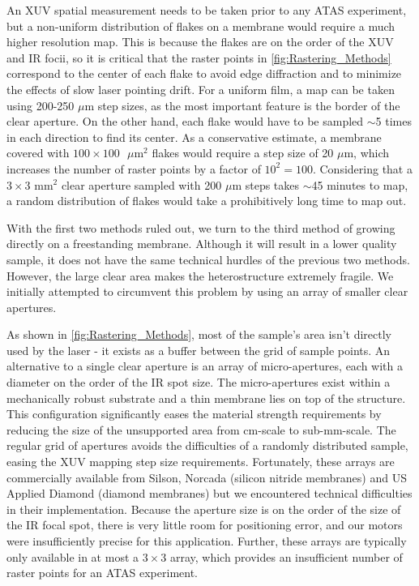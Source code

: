 An XUV spatial measurement needs to be taken prior to any ATAS experiment, but a non-uniform distribution of flakes on a membrane would require a much higher resolution map. This is because the flakes are on the order of the XUV and IR focii, so it is critical that the raster points in \cref{fig:Rastering_Methods} correspond to the center of each flake to avoid edge diffraction and to minimize the effects of slow laser pointing drift. For a uniform film, a map can be taken using 200-250 $\mu$m step sizes, as the most important feature is the border of the clear aperture. On the other hand, each flake would have to be sampled $\sim$5 times in each direction to find its center. As a conservative estimate, a membrane covered with $100 \times 100\text{ }\mu$m$^2$ flakes would require a step size of 20 $\mu$m, which increases the number of raster points by a factor of $10^2 = 100$. Considering that a $3 \times 3 \text{ mm}^2$ clear aperture sampled with 200 $\mu$m steps takes $\sim$45 minutes to map, a random distribution of flakes would take a prohibitively long time to map out.

With the first two methods ruled out, we turn to the third method of growing directly on a freestanding membrane. Although it will result in a lower quality sample, it does not have the same technical hurdles of the previous two methods. However, the large clear area makes the heterostructure extremely fragile. We initially attempted to circumvent this problem by using an array of smaller clear apertures.

As shown in \cref{fig:Rastering_Methods}, most of the sample's area isn't directly used by the laser - it exists as a buffer between the grid of sample points. An alternative to a single clear aperture is an array of micro-apertures, each with a diameter on the order of the IR spot size. The micro-apertures exist within a mechanically robust substrate and a thin membrane lies on top of the structure. This configuration significantly eases the material strength requirements by reducing the size of the unsupported area from cm-scale to sub-mm-scale. The regular grid of apertures avoids the difficulties of a randomly distributed sample, easing the XUV mapping step size requirements. Fortunately, these arrays are commercially available from Silson, Norcada (silicon nitride membranes) and US Applied Diamond (diamond membranes) but we encountered technical difficulties in their implementation. Because the aperture size is on the order of the size of the IR focal spot, there is very little room for positioning error, and our motors were insufficiently precise for this application. Further, these arrays are typically only available in at most a $3\times3$ array, which provides an insufficient number of raster points for an ATAS experiment.

